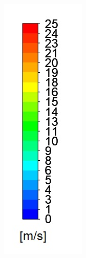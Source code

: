 \documentclass{webofc}
\begin{document}
\begin{figure}[h!]
\centering
\includegraphics[scale = 0.3]{velo}

\end{figure}
\end{document}
